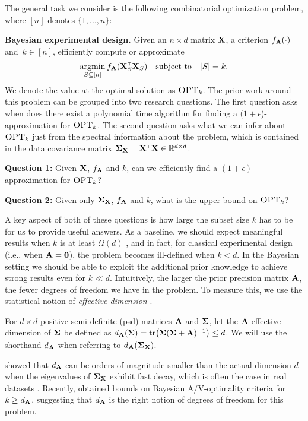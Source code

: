 \documentclass[11pt]{article}
\begin{document}
The general task we consider is the following combinatorial
optimization problem, where $[n]$
denotes $\{1,...,n\}$:

\textbf{Bayesian experimental design.}
Given an $n\times d$ matrix $\mathbf X$,
a criterion $f_{\mathbf A}(\cdot)$ and~$k\in[n]$,
efficiently compute or approximate
\begin{align*}
\argmin_{S \subseteq [n]} f_{\A}(\X_S^\top\X_S)\quad\text{subject
  to}\quad |S|=k.
\end{align*}
We denote the value at the optimal solution as ${\textsc{OPT}_k}$.
The prior work around this problem can be grouped into two research questions.
The first question asks when does there exist a
polynomial time algorithm for finding a $(1+\epsilon$)-approximation
for ${\textsc{OPT}_k}$.
The second question asks what we can
infer about ${\textsc{OPT}_k}$ just from the spectral
information about the problem, which is contained in the data covariance matrix
$\Sigmab_\X=\X^\top\X\in\R^{d\times d}$.


\textbf{Question 1:} \quad
Given $\mathbf X$, $f_{\mathbf A}$ and $k$, can we efficiently find a $(1+\epsilon)$-approximation for
${\textsc{OPT}_k}$?

\textbf{Question 2:} \quad
Given only $\mathbf{\Sigma}_{\mathbf X}$, $f_{\mathbf A}$ and $k$,
what is the upper bound on ${\textsc{OPT}_k}$?


A key aspect of both of these questions is how large the subset
size $k$ has to be for us to provide useful answers. As a baseline, we
should expect meaningful results when $k$ is at least $\Omega(d)$ \citep[see
discussion in][]{near-optimal-design}, and in fact,
for classical experimental design (i.e., when $\mathbf A=\mathbf 0$), the problem
becomes ill-defined 
when $k<d$. In the Bayesian setting we should be able to exploit the
additional prior knowledge 
to achieve strong results even for $k\ll d$. Intuitively, the larger
the prior precision matrix $\mathbf A$, the fewer degrees of freedom we have
in the problem. To measure this, we use the statistical notion of
\emph{effective dimension} \citep{ridge-leverage-scores}.
\begin{definition}
For $d\times d$ positive semi-definite (psd) matrices $\mathbf A$ and $\mathbf{\Sigma}$,
  let the $\mathbf A$-effective dimension of $\mathbf{\Sigma}$
be defined as $d_{\mathbf A}(\mathbf{\Sigma}) =
\mathrm{tr}\big(\mathbf{\Sigma}(\mathbf{\Sigma}+\mathbf A)^{-1}\big) \leq d$.
We will use the shorthand $d_{\mathbf A}$ when referring to $d_{\mathbf A}(\mathbf{\Sigma}_{\mathbf X})$.
\end{definition}
\cite{klivans-goel17} showed that $d_\mathbf A$ can be orders of
  magnitude smaller than the 
actual dimension $d$ when the eigenvalues of $\mathbf{\Sigma}_\mathbf X$ exhibit fast
decay, which is often the case in real datasets
\citep{revisiting-nystrom}. Recently,
\cite{regularized-volume-sampling} obtained bounds on Bayesian 
A/V-optimality criteria for $k\geq d_{\mathbf A}$, suggesting that $d_{\mathbf A}$
is the right notion of degrees of freedom for this problem.
\end{document}
